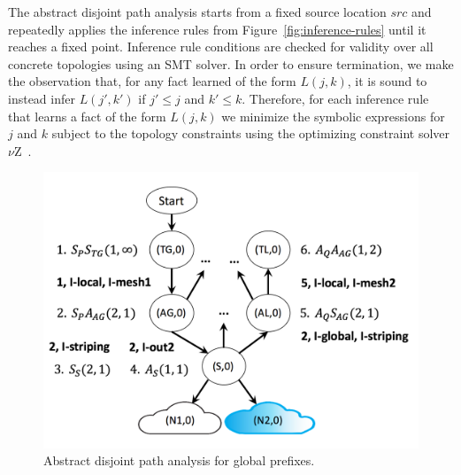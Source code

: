 \documentclass[numbers, 10pt, preprint]{sigplanconf}
\begin{document}
The abstract disjoint path analysis starts from a fixed source location $src$ and repeatedly applies the inference rules from Figure~\ref{fig:inference-rules} until it reaches a fixed point. Inference rule conditions are checked for validity over all concrete topologies using an SMT solver. In order to ensure termination, we make the observation that, for any fact learned of the form $L(j,k)$, it is sound to instead infer $L(j',k')$ if $j' \leq j$ and $k' \leq k$. Therefore, for each inference rule that learns a fact of the form $L(j,k)$ we minimize the symbolic expressions for $j$ and $k$ subject to the topology constraints using the optimizing constraint solver $\nu$Z~\cite{z3opt}.

\begin{figure}
  \begin{center}
    \includegraphics[width=\columnwidth]{figures/analysis}
  \end{center}
  \vspace{-1.4em}
  \caption{Abstract disjoint path analysis for global prefixes. \label{fig:compilation-times}}
  \label{fig:example-inference}
  \vspace{0em}
\end{figure}
\end{document}
